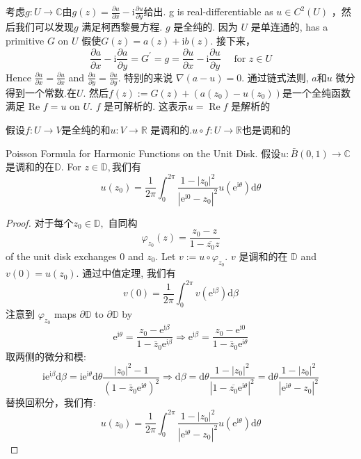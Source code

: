 \documentclass[cn,11pt,chinese,black]{elegantbook}
\begin{document}
\noindent 考虑$g: U \rightarrow \mathbb{C}$由$g(z)=\frac{\partial u}{\partial x}-\mathrm{i} \frac{\partial u}{\partial y}$给出. g is real-differentiable as $u \in C^{2}(U)$ ，然后我们可以发现$g$ 满足柯西黎曼方程.  $g$ 是全纯的. 因为 $U$ 是单连通的,  has a primitive $G$ on $U$
假使$G(z)=a(z)+\mathrm{i} b(z) .$ 接下来，
$$
\frac{\partial a}{\partial x}-\mathrm{i} \frac{\partial a}{\partial y}=G^{\prime}=g=\frac{\partial u}{\partial x}-\mathrm{i} \frac{\partial u}{\partial y} \quad \text { for } z \in U
$$
Hence $\frac{\partial a}{\partial x}=\frac{\partial u}{\partial x}$ and $\frac{\partial a}{\partial y}=\frac{\partial u}{\partial y} .$ 特别的来说 $\nabla(a-u)=0 .$ 通过链式法则, $a$和$u$ 微分得到一个常数.在$U .$ 然后$f(z):=G(z)+\left(a\left(z_{0}\right)-u\left(z_{0}\right)\right)$是一个全纯函数满足 Re $f=u$ on $U .$ $f$ 是可解析的. 这表示$u=\operatorname{Re} f$ 是解析的
\begin{lemma}
\noindent 假设$f: U \rightarrow V$是全纯的和$u: V \rightarrow \mathbb{R}$ 是调和的.$u \circ f: U \rightarrow \mathbb{R}$也是调和的
\end{lemma}
\begin{theorem}{Poisson Formula for Harmonic Functions on the Unit Disk.}
\noindent 假设$u: \bar{B}(0,1) \rightarrow \mathbb{C}$ 是调和的在$\mathbb{D} .$ For $z \in \mathbb{D},$我们有
\[
u\left(z_{0}\right)=\frac{1}{2 \pi} \int_{0}^{2 \pi} \frac{1-\left|z_{0}\right|^{2}}{\left|\mathrm{e}^{\mathrm{i} 0}-z_{0}\right|^{2}} u\left(\mathrm{e}^{\mathrm{i} \theta}\right) \mathrm{d} \theta
\]
\end{theorem}
\begin{proof}
对于每个$z_{0} \in \mathbb{D},$ 自同构
\[
\varphi_{z_{0}}(z)=\frac{z_{0}-z}{1-\overline{z_{0}} z}
\]
of the unit disk exchanges 0 and $z_{0} .$ Let $v:=u \circ \varphi_{z_{0}} .$ $v$ 是调和的在 $\mathbb{D}$ and $v(0)=u\left(z_{0}\right) .$ 通过中值定理, 我们有
\[
v(0)=\frac{1}{2 \pi} \int_{0}^{2 \pi} v\left(\mathrm{e}^{\mathrm{i} \beta}\right) \mathrm{d} \beta
\]
注意到 $\varphi_{z_{0}}$ maps $\partial \mathbb{D}$ to $\partial \mathbb{D}$ by
\[
\mathrm{e}^{\mathrm{i} \theta}=\frac{z_{0}-\mathrm{e}^{\mathrm{i} \beta}}{1-\bar{z}_{0} \mathrm{e}^{\mathrm{i} \beta}} \Rightarrow \mathrm{e}^{\mathrm{i} \beta}=\frac{z_{0}-\mathrm{e}^{\mathrm{i} 0}}{1-\bar{z}_{0} \mathrm{e}^{\mathrm{i} \theta}}
\]
取两侧的微分和模:
\[
\mathrm{i} \mathrm{e}^{\mathrm{i} \beta} \mathrm{d} \beta=\mathrm{i} \mathrm{e}^{\mathrm{i} \theta} \mathrm{d} \theta \frac{\left|z_{0}\right|^{2}-1}{\left(1-\bar{z}_{0} \mathrm{e}^{\mathrm{i} \theta}\right)^{2}} \Rightarrow \mathrm{d} \beta=\mathrm{d} \theta \frac{1-\left|z_{0}\right|^{2}}{\left|1-\overline{z_{0}} \mathrm{e}^{\mathrm{i} \theta}\right|^{2}}=\mathrm{d} \theta \frac{1-\left|z_{0}\right|^{2}}{\left|\mathrm{e}^{\mathrm{i} \theta}-z_{0}\right|^{2}}
\]
替换回积分，我们有:
\[
u\left(z_{0}\right)=\frac{1}{2 \pi} \int_{0}^{2 \pi} \frac{1-\left|z_{0}\right|^{2}}{\left|\mathrm{e}^{\mathrm{i} \theta}-z_{0}\right|^{2}} u\left(\mathrm{e}^{\mathrm{i} \theta}\right) \mathrm{d} \theta
\]
\end{proof}
\end{document}
